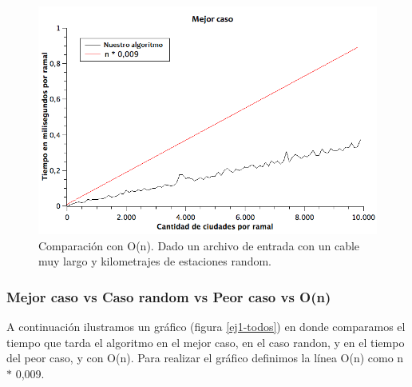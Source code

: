 \begin{figure}[H]
\begin{center}

  \includegraphics[width=\linewidth]{../graficos/ej1/MejorCaso.png}
  \caption{{\small Comparación con O(n). Dado un archivo de entrada con un cable muy largo y kilometrajes de estaciones random.}} \label{ej1-mejor}
\endminipage

\end{center}
\end{figure}

\subsubsection{Mejor caso vs Caso random vs Peor caso vs O(n)}

A continuación ilustramos un gráfico (figura \ref{ej1-todos}) en donde comparamos el tiempo que tarda el algoritmo en el mejor caso, en el caso randon, y en el tiempo del peor caso, y con O(n). Para realizar el gráfico definimos la línea O(n) como n $*$ 0,009.

